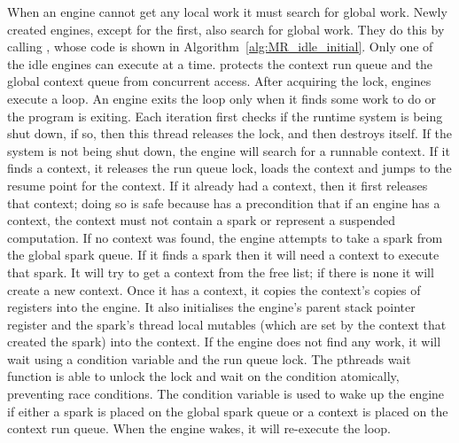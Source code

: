 When an engine cannot get any local work it must search for global work.
Newly created engines, except for the first, also search for global work.
They do this by calling \idle,
whose code is shown in Algorithm~\ref{alg:MR_idle_initial}.
Only one of the idle engines can execute \idle at a time.
 protects the context run queue and the
global context queue from concurrent access.
After acquiring the lock,
engines execute a loop.
An engine exits the loop only when it finds some work to do or the
program is exiting.
Each iteration first checks if the runtime system is being shut down,
if so,
then this thread releases the lock,
and then destroys itself.
If the system is not being shut down,
the engine will search for a runnable context.
If it finds a context, it releases the run queue lock, loads the context
and jumps to the resume point for the context.
If it already had a context, then it first releases that context;
doing so is safe because \idle has a precondition that if an engine has a
context,
the context must not contain a spark or represent a suspended computation.
If no context was found, the engine attempts to take a spark from the global
spark queue.
If it finds a spark then it will need a context to execute that spark.
It will try to get a context from the free list;
if there is none it will create a new context.
Once it has a context,
it copies the context's copies of registers into the engine.
It also initialises the engine's parent stack pointer
register and the spark's thread local mutables
(which are set by the context that created the spark)
into the context.
If the engine does not find any work,
it will wait using a condition variable and the run queue lock.
The pthreads wait function is able to unlock the lock and wait on the
condition atomically, preventing race conditions.
The condition variable is used to wake up the engine if either a spark is
placed on the global spark queue or a context is placed on the context run
queue.
When the engine wakes,
it will re-execute the loop.

